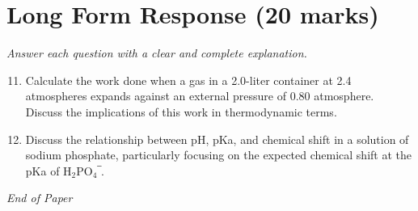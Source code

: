 \documentclass[12pt]{article}
\begin{document}
\section*{Long Form Response (20 marks)}
\textit{Answer each question with a clear and complete explanation.}
\begin{enumerate}[label=\arabic*.]
\setcounter{enumi}{10}
\item Calculate the work done when a gas in a 2.0-liter container at 2.4 atmospheres expands against an external pressure of 0.80 atmosphere. Discuss the implications of this work in thermodynamic terms.
\item Discuss the relationship between pH, pKa, and chemical shift in a solution of sodium phosphate, particularly focusing on the expected chemical shift at the pKa of H$_{2}$PO$_{4}$‾.
\end{enumerate}

\vfill
\noindent\textit{End of Paper}
\end{document}
